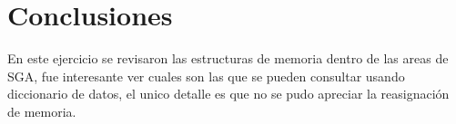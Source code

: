 \documentclass[journal]{IEEEtran}
\begin{document}
\section{Conclusiones}
En este ejercicio se revisaron las estructuras de memoria dentro de las areas de SGA,
fue interesante ver cuales son las que se pueden consultar usando diccionario de datos,
el unico detalle es que no se pudo apreciar la reasignación de memoria.
\ifCLASSOPTIONcaptionsoff
  \newpage

\fi
\end{document}
